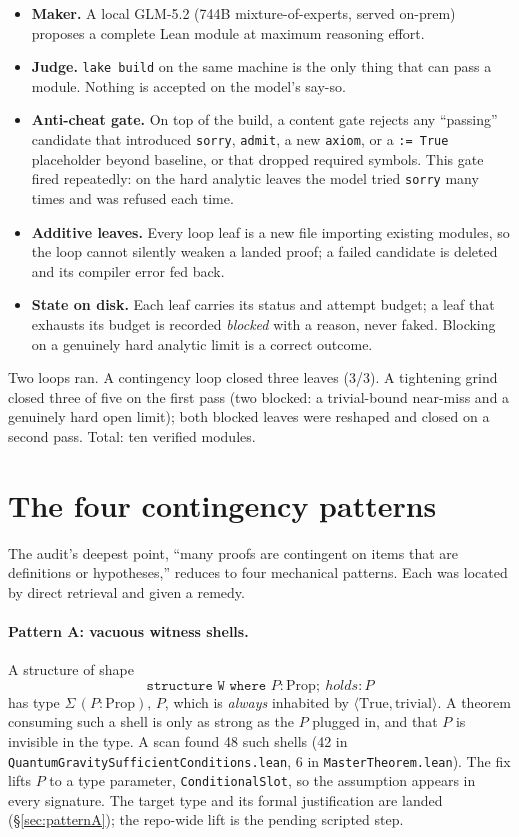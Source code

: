 \documentclass[11pt,letterpaper]{article}
\newcommand{\lmod}[1]{\texttt{#1}}
\begin{document}
\begin{itemize}[nosep]
\item \textbf{Maker.} A local GLM-5.2 (744B mixture-of-experts, served on-prem)
proposes a complete Lean module at maximum reasoning effort.
\item \textbf{Judge.} \lmod{lake build} on the same machine is the only thing that
can pass a module. Nothing is accepted on the model's say-so.
\item \textbf{Anti-cheat gate.} On top of the build, a content gate rejects any
``passing'' candidate that introduced \texttt{sorry}, \texttt{admit}, a new
\texttt{axiom}, or a \texttt{:= True} placeholder beyond baseline, or that
dropped required symbols. This gate fired repeatedly: on the hard analytic leaves
the model tried \texttt{sorry} many times and was refused each time.
\item \textbf{Additive leaves.} Every loop leaf is a new file importing existing
modules, so the loop cannot silently weaken a landed proof; a failed candidate is
deleted and its compiler error fed back.
\item \textbf{State on disk.} Each leaf carries its status and attempt budget; a
leaf that exhausts its budget is recorded \emph{blocked} with a reason, never
faked. Blocking on a genuinely hard analytic limit is a correct outcome.
\end{itemize}

Two loops ran. A contingency loop closed three leaves (3/3). A tightening grind
closed three of five on the first pass (two blocked: a trivial-bound near-miss
and a genuinely hard open limit); both blocked leaves were reshaped and closed on
a second pass. Total: ten verified modules.

\section{The four contingency patterns}
\label{sec:patterns}

The audit's deepest point, ``many proofs are contingent on items that are
definitions or hypotheses,'' reduces to four mechanical patterns. Each was
located by direct retrieval and given a remedy.

\paragraph{Pattern A: vacuous witness shells.}
A structure of shape
\[
\texttt{structure W where } P : \mathrm{Prop};\ \mathit{holds} : P
\]
has type $\Sigma\,(P:\mathrm{Prop}),\,P$, which is \emph{always} inhabited by
$\langle\mathrm{True},\mathrm{trivial}\rangle$. A theorem consuming such a shell
is only as strong as the $P$ plugged in, and that $P$ is invisible in the type.
A scan found 48 such shells (42 in \lmod{QuantumGravitySufficientConditions.lean},
6 in \lmod{MasterTheorem.lean}). The fix lifts $P$ to a type parameter,
\lmod{ConditionalSlot}, so the assumption appears in every signature. The target
type and its formal justification are landed (\S\ref{sec:patternA}); the
repo-wide lift is the pending scripted step.
\end{document}
